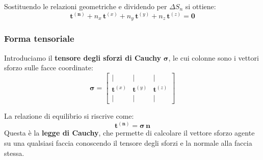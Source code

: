 Sostituendo le relazioni geometriche e dividendo per $\Delta S_n$ si ottiene:
\begin{equation*}
\mathbf{t}^{(\mathbf{n})} + n_x \, \mathbf{t}^{(x)} + n_y \, \mathbf{t}^{(y)} + n_z \, \mathbf{t}^{(z)} = \mathbf{0}
\end{equation*}

\subsubsection*{Forma tensoriale}
Introduciamo il \textbf{tensore degli sforzi di Cauchy} $\boldsymbol{\sigma}$, le cui colonne sono i vettori sforzo sulle facce coordinate:
\begin{equation*}
\boldsymbol{\sigma} =
\begin{bmatrix}
| & | & | \\
\mathbf{t}^{(x)} & \mathbf{t}^{(y)} & \mathbf{t}^{(z)} \\
| & | & |
\end{bmatrix}
\end{equation*}

La relazione di equilibrio si riscrive come:
\begin{equation*}
\mathbf{t}^{(\mathbf{n})} = \boldsymbol{\sigma} \, \mathbf{n}
\end{equation*}
Questa è la \textbf{legge di Cauchy}, che permette di calcolare il vettore sforzo agente su una qualsiasi faccia conoscendo il tensore degli sforzi e la normale alla faccia stessa.
